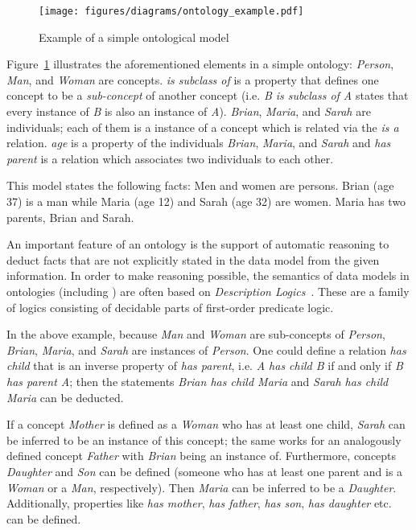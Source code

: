 \vspace{1em}

\begin{figure}
\centering
\texttt{[image: figures/diagrams/ontology\_example.pdf]}
\caption{Example of a simple ontological model}
\label{fig:ontology_example}
\end{figure}

Figure~\ref{fig:ontology_example} illustrates the aforementioned elements in a simple ontology: \emph{Person}, \emph{Man}, and \emph{Woman} are concepts. \emph{is subclass of} is a property that defines one concept to be a \emph{sub-concept} of another concept (i.e. \emph{B is subclass of A} states that every instance of \emph{B} is also an instance of \emph{A}). \emph{Brian}, \emph{Maria}, and \emph{Sarah} are individuals; each of them is a instance of a concept which is related via the \emph{is a} relation. \emph{age} is a property of the individuals \emph{Brian}, \emph{Maria}, and \emph{Sarah} and \emph{has parent} is a relation which associates two individuals to each other.

This model states the following facts: Men and women are persons. Brian (age 37) is a man while Maria (age 12) and Sarah (age 32) are women. Maria has two parents, Brian and Sarah.

\vspace{1em}

An important feature of an ontology is the support of automatic reasoning to deduct facts that are not explicitly stated in the data model from the given information. In order to make reasoning possible, the semantics of data models in ontologies (including ) are often based on \emph{Description Logics}~\cite{OWL,SROIQ}. These are a family of logics consisting of decidable parts of first-order predicate logic.

In the above example, because \emph{Man} and \emph{Woman} are sub-concepts of \emph{Person}, \emph{Brian}, \emph{Maria}, and \emph{Sarah} are instances of \emph{Person}. One could define a relation \emph{has child} that is an inverse property of \emph{has parent}, i.e. \emph{A has child B} if and only if \emph{B has parent A}; then the statements \emph{Brian has child Maria} and \emph{Sarah has child Maria} can be deducted.

If a concept \emph{Mother} is defined as a \emph{Woman} who has at least one child, \emph{Sarah} can be inferred to be an instance of this concept; the same works for an analogously defined concept \emph{Father} with \emph{Brian} being an instance of. Furthermore, concepts \emph{Daughter} and \emph{Son} can be defined (someone who has at least one parent and is a \emph{Woman} or a \emph{Man}, respectively). Then \emph{Maria} can be inferred to be a \emph{Daughter}. Additionally, properties like \emph{has mother}, \emph{has father}, \emph{has son}, \emph{has daughter} etc. can be defined.

